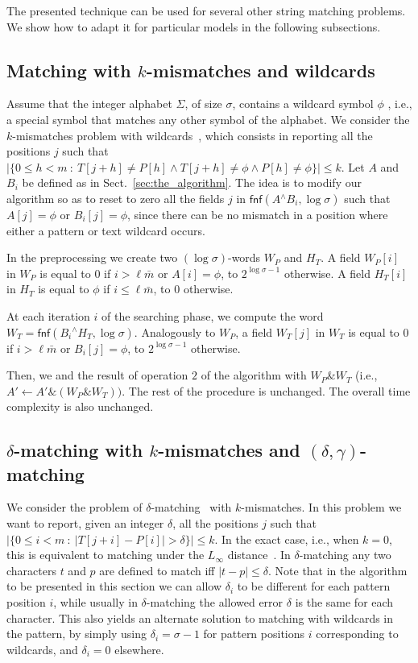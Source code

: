 \documentclass{llncs}
\def \band{\textsf{and}\xspace}
\newcommand{\uxor}{\mathrel{^\wedge}}
\newcommand{\uand}{\mathrel{\&}}
\newcommand{\word}[1]{#1}
\newcommand{\fword}[1]{$(#1)$-word}
\begin{document}
\noindent
The presented technique can be used for several other string matching problems.
We show how to adapt it for particular models in the following subsections.

\subsection{Matching with $k$-mismatches and wildcards}
Assume that the integer alphabet $\Sigma$, of size $\sigma$, contains a
wildcard symbol $\phi$ , i.e., a special symbol that matches any other
symbol of the alphabet. We consider the $k$-mismatches problem with
wildcards~\cite{DBLP:conf/soda/CliffordEPR09}, which consists in reporting all the positions $j$ such that
$|\{0 \leq h < m\ :\ T[j + h]\neq P[h]\wedge T[j + h]\neq \phi\wedge
P[h]\neq \phi\}|\le k$.
Let $A$ and $B_i$ be defined as in Sect.~\ref{sec:the_algorithm}.
The idea is to modify our algorithm so as to reset to zero all the
fields $j$ in $\textsf{fnf}(A \uxor B_i, \log\sigma)$ such that $A[j] = \phi$ or
$B_i[j] = \phi$, since there can be no mismatch in a position where
either a pattern or text wildcard occurs.

In the preprocessing we create two \fword{\log\sigma}s $W_P$ and $H_T$.
A field $W_P[i]$ in $W_P$ is equal to $0$ if $i > \ell\bar{m}$ or
$A[i] = \phi$, to $2^{\log\sigma-1}$ otherwise. A field
$H_T[i]$ in $H_T$ is equal to $\phi$ if $i\le \ell\bar{m}$,
to $0$ otherwise.

At each iteration $i$ of the searching phase, we compute the word $W_T =
\textsf{fnf}(B_i\uxor H_T, \log\sigma)$.
Analogously to $W_P$, a field $W_T[j]$ in $W_T$ is equal to $0$ if
$i > \ell\bar{m}$ or $\word{B}_i[j] = \phi$, to $2^{\log\sigma-1}$ otherwise.

Then, we \band the result of operation $2$ of the algorithm with
$W_P\uand W_T$ (i.e., $\word{A'}\leftarrow \word{A'} \uand (W_P\uand
W_T))$. The rest of
the procedure is unchanged. The overall time complexity is also
unchanged.

\subsection{$\delta$-matching with $k$-mismatches and $(\delta,\gamma)$-matching}

We consider the problem of $\delta$-matching~\cite{CCIMPijcm02,DBLP:conf/cpm/CliffordCI05} with $k$-mismatches.
In this problem we want to report, given an integer $\delta$, all the positions $j$ such
that $|\{0 \leq i < m\ :\ |T[j + i] - P[i]| > \delta\}|\le k$.
In the exact case, i.e., when $k=0$, this is equivalent to matching under the $L_\infty$ distance~\cite{DBLP:conf/cpm/CliffordCI05}.
In $\delta$-matching any two characters $t$ and $p$ are defined to match iff $|t-p| \leq \delta$.
Note that in the algorithm to be presented in this section we can allow $\delta_i$ to be different for each pattern position $i$,
while usually in $\delta$-matching the allowed error $\delta$ is the same for each character.
This also yields an alternate solution to matching with wildcards in the pattern, by simply
using $\delta_i = \sigma-1$ for pattern positions $i$ corresponding to wildcards, and $\delta_i = 0$ elsewhere.
\end{document}
